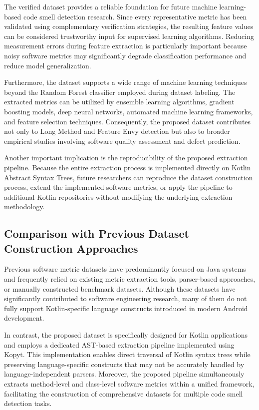 \documentclass[]{einformatica}
\begin{document}
The verified dataset provides a reliable foundation for future machine learning-based code smell detection research. Since every representative metric has been validated using complementary verification strategies, the resulting feature values can be considered trustworthy input for supervised learning algorithms. Reducing measurement errors during feature extraction is particularly important because noisy software metrics may significantly degrade classification performance and reduce model generalization.

Furthermore, the dataset supports a wide range of machine learning techniques beyond the Random Forest classifier employed during dataset labeling. The extracted metrics can be utilized by ensemble learning algorithms, gradient boosting models, deep neural networks, automated machine learning frameworks, and feature selection techniques. Consequently, the proposed dataset contributes not only to Long Method and Feature Envy detection but also to broader empirical studies involving software quality assessment and defect prediction.

Another important implication is the reproducibility of the proposed extraction pipeline. Because the entire extraction process is implemented directly on Kotlin Abstract Syntax Trees, future researchers can reproduce the dataset construction process, extend the implemented software metrics, or apply the pipeline to additional Kotlin repositories without modifying the underlying extraction methodology.

\subsection{Comparison with Previous Dataset Construction Approaches}

Previous software metric datasets have predominantly focused on Java systems and frequently relied on existing metric extraction tools, parser-based approaches, or manually constructed benchmark datasets. Although these datasets have significantly contributed to software engineering research, many of them do not fully support Kotlin-specific language constructs introduced in modern Android development.

In contrast, the proposed dataset is specifically designed for Kotlin applications and employs a dedicated AST-based extraction pipeline implemented using Kopyt. This implementation enables direct traversal of Kotlin syntax trees while preserving language-specific constructs that may not be accurately handled by language-independent parsers. Moreover, the proposed pipeline simultaneously extracts method-level and class-level software metrics within a unified framework, facilitating the construction of comprehensive datasets for multiple code smell detection tasks.
\end{document}
